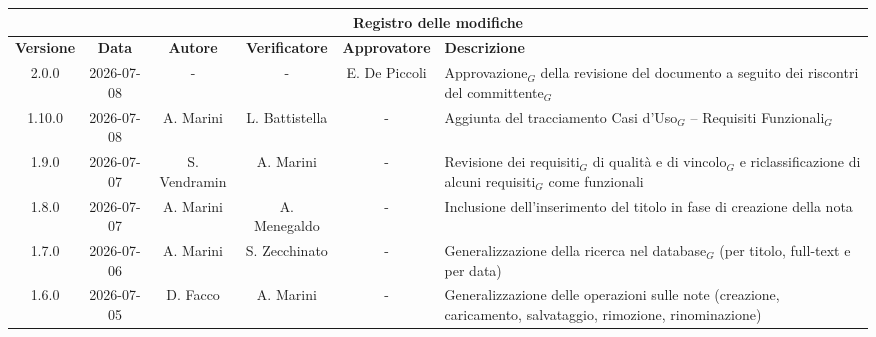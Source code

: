 \documentclass[a4paper, 10pt]{article}
\begin{document}
\raggedbottom

\setlength{\emergencystretch}{2em}

\newcommand{\titolo}{Analisi dei Requisiti}
\newcommand{\dataverbale}{}
\newcommand{\dataversione}{2026-07-08}
\newcommand{\versione}{2.0.0}
\newcommand{\stato}{Approvato}
\newcommand{\destinatari}{The Bitless, prof. T. Vardanega, prof. R. Cardin, Zucchetti}
\def\templatedir{../../../templates}
\setcounter{secnumdepth}{5}
\setcounter{tocdepth}{5}

\begin{titlepage}

\end{titlepage}

\newpage
{}

\begingroup
\small
\begin{longtable}{|c|c|c|c|c|p{3cm}|}
    \hline
    \multicolumn{6}{|c|}{\textbf{Registro delle modifiche}} \\
    \hline
    \textbf{Versione} & \textbf{Data} & \textbf{Autore} & \textbf{Verificatore} & \textbf{Approvatore} & \textbf{Descrizione} \\
    \hline
    \endhead
    2.0.0 & 2026-07-08 & - & - & E. De Piccoli & Approvazione$_G$ della revisione del documento a seguito dei riscontri del committente$_G$\\ \hline

    1.10.0 & 2026-07-08 & A. Marini & L. Battistella & - & Aggiunta del tracciamento Casi d'Uso$_G$ -- Requisiti Funzionali$_G$\\ \hline

    1.9.0 & 2026-07-07 & S. Vendramin & A. Marini & - & Revisione dei requisiti$_G$ di qualità e di vincolo$_G$ e riclassificazione di alcuni requisiti$_G$ come funzionali\\ \hline

    1.8.0 & 2026-07-07 & A. Marini & A. Menegaldo & - & Inclusione dell'inserimento del titolo in fase di creazione della nota\\ \hline

    1.7.0 & 2026-07-06 & A. Marini & S. Zecchinato & - & Generalizzazione della ricerca nel database$_G$ (per titolo, full-text e per data)\\ \hline

    1.6.0 & 2026-07-05 & D. Facco & A. Marini & - & Generalizzazione delle operazioni sulle note (creazione, caricamento, salvataggio, rimozione, rinominazione)\\ \hline


\end{longtable}
\end{document}
